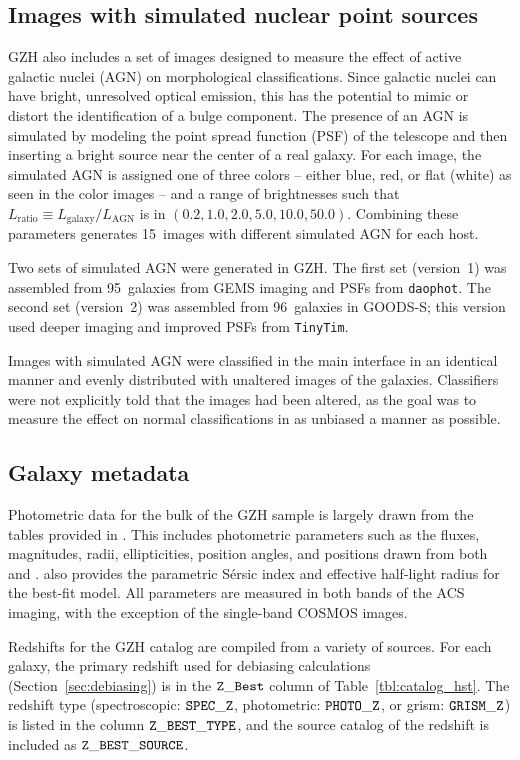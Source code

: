 \documentclass[twocolumn]{aastex6}
\begin{document}
\subsection{Images with simulated nuclear point sources}

GZH also includes a set of images designed to measure the effect of active galactic nuclei (AGN) on morphological classifications. Since galactic nuclei can have bright, unresolved optical emission, this has the potential to mimic or distort the identification of a bulge component. The presence of an AGN is simulated by modeling the point spread function (PSF) of the telescope and then inserting a bright source near the center of a real galaxy. For each image, the simulated AGN is assigned one of three colors -- either blue, red, or flat (white) as seen in the color images -- and a range of brightnesses such that $L_\mathrm{ratio} \equiv L_\mathrm{galaxy}/L_\mathrm{AGN}$ is in $(0.2,1.0,2.0,5.0,10.0,50.0)$. Combining these parameters generates 15~images with different simulated AGN for each host. 

Two sets of simulated AGN were generated in GZH. The first set (version~1) was assembled from 95~galaxies from GEMS imaging and PSFs from \texttt{daophot}. The second set (version~2) was assembled from 96~galaxies in GOODS-S; this version used deeper imaging and improved PSFs from \texttt{TinyTim}. 

Images with simulated AGN were classified in the main interface in an identical manner and evenly distributed with unaltered images of the galaxies. Classifiers were not explicitly told that the images had been altered, as the goal was to measure the effect on normal classifications in as unbiased a manner as possible. 

\subsection{Galaxy metadata}

Photometric data for the bulk of the GZH sample is largely drawn from the tables provided in \citet{gri12}. This includes photometric parameters such as the fluxes, magnitudes, radii, ellipticities, position angles, and positions drawn from both \sextractor{} and \galfit. \galfit{} also provides the parametric S\'{e}rsic index and effective half-light radius for the best-fit model. All parameters are measured in both bands of the ACS imaging, with the exception of the single-band COSMOS images.

Redshifts for the GZH catalog are compiled from a variety of sources. For each galaxy, the primary redshift used for debiasing calculations (Section~\ref{sec:debiasing}) is in the $\tt Z\_Best$ column of Table~\ref{tbl:catalog_hst}. The redshift type (spectroscopic: $\tt SPEC\_Z$, photometric: $\tt PHOTO\_Z$, or grism: $ \tt GRISM\_Z$) is listed in the column $\tt Z\_BEST\_TYPE$, and the source catalog of the redshift is included as $\tt Z\_BEST\_SOURCE$. 
\end{document}
